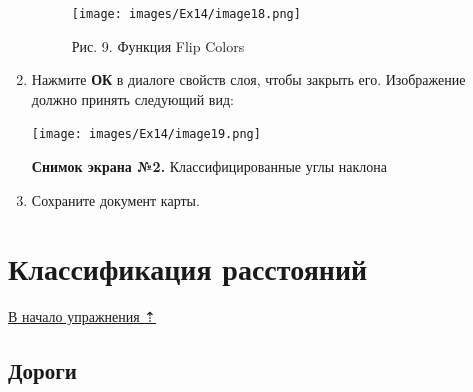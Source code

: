 \documentclass[12pt,]{book}
\begin{document}
\begin{enumerate}
  \begin{figure}
  \centering
  \texttt{[image: images/Ex14/image18.png]}
  \caption{Рис. 9. Функция Flip Colors}
  \end{figure}
\item
  Нажмите \textbf{ОК} в диалоге свойств слоя, чтобы закрыть его. Изображение должно принять следующий вид:

  \texttt{[image: images/Ex14/image19.png]}

  \textbf{Снимок экрана №2.} Классифицированные углы наклона
\item
  Сохраните документ карты.
\end{enumerate}

\hypertarget{weighted-overlay-distance-classes}{%
\section{Классификация расстояний}\label{weighted-overlay-distance-classes}}

\protect\hyperlink{weighted-overlay}{В начало упражнения ⇡}

\hypertarget{weighted-overlay-roads-classes}{%
\subsection{Дороги}\label{weighted-overlay-roads-classes}}
\end{document}
